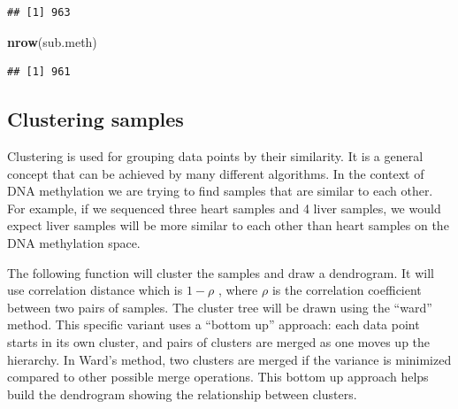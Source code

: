 \documentclass[12pt,]{krantz}
\newenvironment{Shaded}{\begin{snugshade}}{\end{snugshade}}
\newcommand{\CommentTok}[1]{\textcolor[rgb]{0.56,0.35,0.01}{\textit{#1}}}
\newcommand{\DataTypeTok}[1]{\textcolor[rgb]{0.13,0.29,0.53}{#1}}
\newcommand{\DecValTok}[1]{\textcolor[rgb]{0.00,0.00,0.81}{#1}}
\newcommand{\KeywordTok}[1]{\textcolor[rgb]{0.13,0.29,0.53}{\textbf{#1}}}
\newcommand{\NormalTok}[1]{#1}
\newcommand{\OperatorTok}[1]{\textcolor[rgb]{0.81,0.36,0.00}{\textbf{#1}}}
\newcommand{\StringTok}[1]{\textcolor[rgb]{0.31,0.60,0.02}{#1}}
\begin{document}
\begin{Shaded}
\end{Shaded}

\begin{verbatim}
## [1] 963
\end{verbatim}

\begin{Shaded}
\begin{Highlighting}[]
\KeywordTok{nrow}\NormalTok{(sub.meth)}
\end{Highlighting}
\end{Shaded}

\begin{verbatim}
## [1] 961
\end{verbatim}

\hypertarget{clustering-samples}{%
\subsection{Clustering samples}\label{clustering-samples}}

Clustering is used for grouping data points by their similarity. It is a general concept that can be achieved by many different algorithms. In the context of DNA methylation we are trying to find samples that are similar to each other. For example, if we sequenced three heart samples and 4 liver samples, we would expect liver samples will be more similar to each other than heart samples on the DNA methylation space.

The following function will cluster the samples and draw a dendrogram.
It will use correlation distance which is \(1-\rho\) , where \(\rho\) is the correlation coefficient between two pairs of samples. The cluster tree will be drawn using the ``ward'' method. This specific variant uses a ``bottom up'' approach: each data point starts in its own cluster, and pairs of clusters are merged as one moves up the hierarchy. In Ward's method, two clusters are merged if the variance is minimized compared to other possible merge operations. This bottom up approach helps build the dendrogram showing the relationship between clusters.
\end{document}
